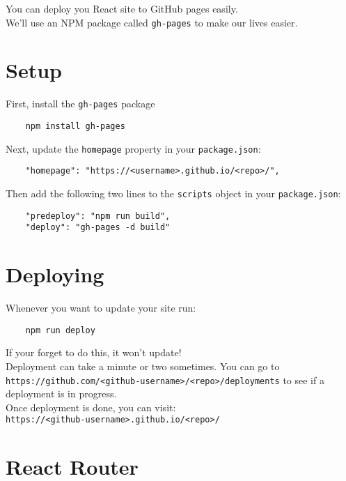 You can deploy you React site to GitHub pages easily.
\\

We'll use an NPM package called \texttt{gh-pages} to make our lives easier.

\section{Setup}

First, install the \texttt{gh-pages} package

\begin{verbatim}
    npm install gh-pages
\end{verbatim}

Next, update the \texttt{homepage} property in your \texttt{package.json}:

\begin{verbatim}
    "homepage": "https://<username>.github.io/<repo>/",
\end{verbatim}

Then add the following two lines to the \texttt{scripts} object in your \texttt{package.json}:

\begin{verbatim}
    "predeploy": "npm run build",
    "deploy": "gh-pages -d build"
\end{verbatim}


\pagebreak


\section{Deploying}

Whenever you want to update your site run:

\begin{verbatim}
    npm run deploy
\end{verbatim}

If your forget to do this, it won't update!
\\

Deployment can take a minute or two sometimes. You can go to \\ \texttt{https://github.com/<github-username>/<repo>/deployments} to see if a deployment is in progress.
\\

Once deployment is done, you can visit:\\ \texttt{https://<github-username>.github.io/<repo>/}


\section{React Router}

